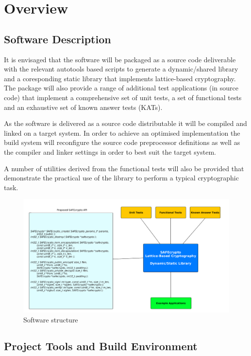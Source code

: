 \chapter{Overview}
\label{ch_overview}

\section{Software Description}

It is envisaged that the software will be packaged as a source code deliverable with the relevant autotools based scripts to generate a dynamic/shared library and a coresponding static library that implements lattice-based cryptography. The package will also provide a range of additional test applications (in source code) that implement a comprehensive set of unit tests, a set of functional tests and an exhaustive set of known answer tests (KATs).

As the software is delivered as a source code distributable it will be compiled and linked on a target system. In order to achieve an optimised implementation the build system will reconfigure the source code preprocessor definitions as well as the compiler and linker settings in order to best suit the target system.

A number of utilities derived from the functional tests will also be provided that demonstrate the practical use of the library to perform a typical cryptographic task.

\begin{figure}[!h]
\centering
\includegraphics[scale=0.45]{../Resources/SAFEcrypto_structure.png}
\caption{Software structure}
\end{figure}


\section{Project Tools and Build Environment}


